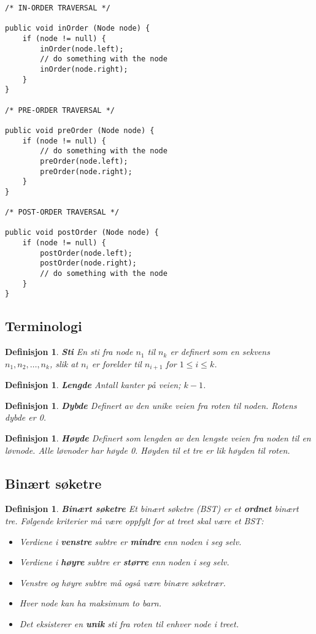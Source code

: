 \documentclass[11pt,a4paper]{article}
\theoremstyle{def}
\newtheorem{definition}[subsection]{Definisjon}
\begin{document}
\begin{lstlisting}[frame=none]
/* IN-ORDER TRAVERSAL */

public void inOrder (Node node) {
	if (node != null) {
		inOrder(node.left);
		// do something with the node
		inOrder(node.right);
	}
}

/* PRE-ORDER TRAVERSAL */

public void preOrder (Node node) {
	if (node != null) {
		// do something with the node
		preOrder(node.left);
		preOrder(node.right);
	}
}

/* POST-ORDER TRAVERSAL */

public void postOrder (Node node) {
	if (node != null) {
		postOrder(node.left);
		postOrder(node.right);
		// do something with the node
	}
}
\end{lstlisting}

\subsection{Terminologi}
\begin{definition}
\emph{\textbf{Sti}}
En sti fra node $n_1$ til $n_k$ er definert som en sekvens $n_1, n_2, \dots, n_k$, slik at $n_i$ er forelder til $n_{i+1}$ for $1 \leq i \leq k$.
\end{definition}
\begin{definition}
\emph{\textbf{Lengde}}
Antall \textit{kanter} på veien; $k-1$.
\end{definition}
\begin{definition}
\emph{\textbf{Dybde}}
Definert av den unike veien fra roten til noden. Rotens dybde er 0.
\end{definition}
\begin{definition}
\emph{\textbf{Høyde}}
Definert som lengden av den \textit{lengste} veien fra noden til en løvnode. Alle løvnoder har høyde 0. Høyden til et tre er lik høyden til roten.
\end{definition}

\subsection{Binært søketre}

\begin{definition}
\emph{\textbf{Binært søketre}}
Et binært søketre (BST) er et \textbf{ordnet} binært tre. Følgende kriterier må være oppfylt for at treet skal være et BST:
\begin{itemize}
\item
Verdiene i \textbf{venstre} subtre er \textbf{mindre} enn noden i seg selv.
\item
Verdiene i \textbf{høyre} subtre er \textbf{større} enn noden i seg selv.
\item
Venstre og høyre subtre må også være binære søketrær.
\item
Hver node kan ha maksimum to barn.
\item
Det eksisterer en \textbf{unik} sti fra roten til enhver node i treet.
\end{itemize}
\end{definition}
\end{document}
